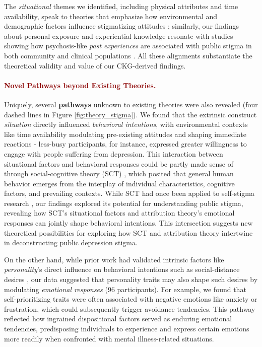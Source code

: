 The \textit{situational} themes we identified, including physical attributes and time availability, speak to theories that emphasize how environmental and demographic factors influence stigmatizing attitudes \cite{sct_self_stigma_catalano_2021}; similarly, our findings about personal exposure and experiential knowledge resonate with studies showing how psychosis-like \textit{past experiences} are associated with public stigma in both community and clinical populations \cite{factor_chandra_2007}.
All these alignments substantiate the theoretical validity and value of our CKG-derived findings.



\paragraph{\textcolor{darkred}{\textbf{Novel Pathways beyond Existing Theories.}}}




Uniquely, several \textbf{pathways} unknown to existing theories were also revealed (four dashed lines in Figure \ref{fig:theory_stigma}).
We found that the extrinsic construct \textit{situation} directly influenced \textit{behavioral intentions}, with environmental contexts like time availability modulating pre-existing attitudes and shaping immediate reactions - less-busy participants, for instance, expressed greater willingness to engage with people suffering from depression.
This interaction between situational factors and behavioral responses could be partly made sense of through social-cognitive theory (SCT) \cite{sct_bandura_2001, sct_self_stigma_catalano_2021}, which posited that general human behavior emerges from the interplay of individual characteristics, cognitive factors, and prevailing contexts.
While SCT had once been applied to self-stigma research \cite{sct_self_stigma_catalano_2021}, our findings explored its potential for understanding public stigma, revealing how SCT's situational factors and attribution theory's emotional responses can jointly shape behavioral intentions. 
This intersection suggests new theoretical possibilities for exploring how SCT and attribution theory intertwine in deconstructing public depression stigma.


On the other hand, while prior work had validated intrinsic factors like \textit{personality}'s direct influence on behavioral intentions such as social-distance desires \cite{personality_reviewer_steiger_2022}, our data suggested that personality traits may also shape such desires by modulating \textit{emotional responses} (96 participants). 
For example, we found that self-prioritizing traits were often associated with negative emotions like anxiety or frustration, which could subsequently trigger avoidance tendencies.
This pathway reflected how ingrained dispositional factors served as enduring emotional tendencies, predisposing individuals to experience and express certain emotions more readily when confronted with mental illness-related situations.

